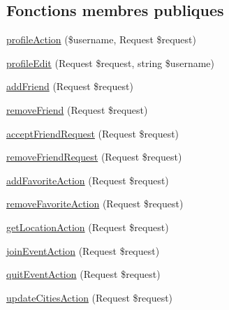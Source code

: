 \subsection*{Fonctions membres publiques}
\begin{DoxyCompactItemize}
\item 
\hyperlink{classAppBundle_1_1Controller_1_1CommunityController_a9a16d7753fcbdaa82cd3f56d5b117389}{profile\+Action} (\$username, Request \$request)
\item 
\hyperlink{classAppBundle_1_1Controller_1_1CommunityController_a254fe03f9c5d22aced8c6fd8bf8fd98d}{profile\+Edit} (Request \$request, string \$username)
\item 
\hyperlink{classAppBundle_1_1Controller_1_1CommunityController_af9281a620be8afbfebcef4910ede38fa}{add\+Friend} (Request \$request)
\item 
\hyperlink{classAppBundle_1_1Controller_1_1CommunityController_afe7246d7f115e157d6ab07a662fcbced}{remove\+Friend} (Request \$request)
\item 
\hyperlink{classAppBundle_1_1Controller_1_1CommunityController_aaec352ba9138f094ebeb67cc84f1c2f2}{accept\+Friend\+Request} (Request \$request)
\item 
\hyperlink{classAppBundle_1_1Controller_1_1CommunityController_a4db8318b023676b683c0aec7c5c260ff}{remove\+Friend\+Request} (Request \$request)
\item 
\hyperlink{classAppBundle_1_1Controller_1_1CommunityController_a7f26d8a801e9ab7b910e9bf6f76cacd6}{add\+Favorite\+Action} (Request \$request)
\item 
\hyperlink{classAppBundle_1_1Controller_1_1CommunityController_aabe67faadd72f242589b5459ce11d7ad}{remove\+Favorite\+Action} (Request \$request)
\item 
\hyperlink{classAppBundle_1_1Controller_1_1CommunityController_a0dda1cbb4b9bb323a51ff7c819f32290}{get\+Location\+Action} (Request \$request)
\item 
\hyperlink{classAppBundle_1_1Controller_1_1CommunityController_a0086746446df9fc76784d057babe7708}{join\+Event\+Action} (Request \$request)
\item 
\hyperlink{classAppBundle_1_1Controller_1_1CommunityController_a20e8b943a1cdc78683436cf32d17b6f1}{quit\+Event\+Action} (Request \$request)
\item 
\hyperlink{classAppBundle_1_1Controller_1_1CommunityController_a5d054da3bc5bdcbdaf4fe460ee12cb97}{update\+Cities\+Action} (Request \$request)
\end{DoxyCompactItemize}


